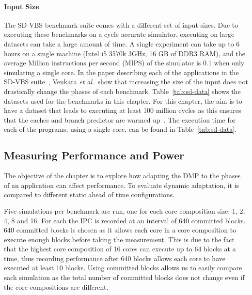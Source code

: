 \paragraph*{Input Size}
The SD-VBS benchmark suite comes with a different set of input sizes.
Due to executing these benchmarks on a cycle accurate simulator, executing on large datasets can take a large amount of time.
A single experiment can take up to 6 hours on a single machine (Intel i5 3570k 3GHz, 16 GB of DDR3 RAM), and the average Million instructions per second (MIPS) of the simulator is 0.1 when only simulating a single core.
In the paper describing each of the applications in the SD-VBS suite~\cite{sdvbs}, Venkata {\it et al.~}show that increasing the size of the input does not drastically change the phases of each benchmark.
Table~\ref{tab:sd-data} shows the datasets used for the benchmarks in this chapter.
For this chapter, the aim is to have a dataset that leads to executing at least 100 million cycles as this ensures that the caches and branch predictor are warmed up~\cite{dubach13dynamic}.
The execution time for each of the programs, using a single core, can be found in Table~\ref{tab:sd-data}.

\subsection{Measuring Performance and Power}

The objective of the chapter is to explore how adapting the DMP to the phases of an application can affect performance.
To evaluate dynamic adaptation, it is compared to different static ahead of time configurations.

Five simulations per benchmark are run, one for each core composition size: 1, 2, 4, 8 and 16.
For each the IPC is recorded at an interval of 640 committed blocks.
640 committed blocks is chosen as it allows each core in a core composition to execute enough blocks before taking the measurement.
This is due to the fact that the highest core composition of 16 cores can execute up to 64 blocks at a time, thus recording performance after 640 blocks allows each core to have executed at least 10 blocks.
Using committed blocks allows us to easily compare each simulation as the total number of committed blocks does not change even if the core compositions are different.

